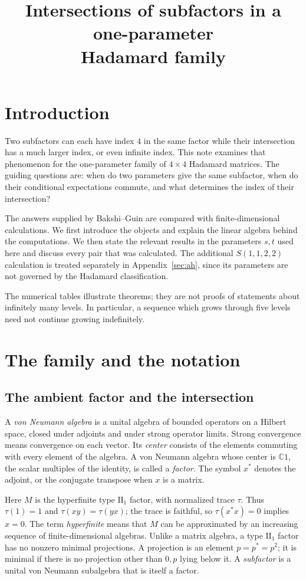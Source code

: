 \documentclass[11pt]{article}
\title{Intersections of subfactors in a one-parameter\\Hadamard family}
\author{}
\date{}
\theoremstyle{definition}
\theoremstyle{remark}
\newcommand{\C}{\mathbb C}
\newcommand{\tr}{\tau}
\begin{document}
\maketitle
\vspace{-2em}

\section{Introduction}
Two subfactors can each have index \(4\) in the same factor while their
intersection has a much larger index, or even infinite index. This note
examines that phenomenon for the one-parameter family of \(4\times4\)
Hadamard matrices. The guiding questions are: when do two parameters give
the same subfactor, when do their conditional expectations commute, and
what determines the index of their intersection?

The answers supplied by Bakshi--Guin are compared with finite-dimensional
calculations. We first introduce the objects and explain the linear algebra
behind the computations. We then state the relevant results in the
parameters \(s,t\) used here and discuss every pair that was calculated.
The additional \(S(1,1,2,2)\) calculation is treated separately in
Appendix~\ref{sec:ah}, since its parameters are not governed by the
Hadamard classification.

The numerical tables illustrate theorems; they are not proofs of
statements about infinitely many levels. In particular, a sequence which
grows through five levels need not continue growing indefinitely.

\section{The family and the notation}\label{sec:setup}
\subsection{The ambient factor and the intersection}
A \emph{von Neumann algebra} is a unital algebra of bounded operators on a
Hilbert space, closed under adjoints and under strong operator limits.
Strong convergence means convergence on each vector. Its \emph{center}
consists of the elements commuting with every element of the algebra.
A von Neumann algebra whose center is \(\C1\), the scalar multiples of
the identity, is called a \emph{factor}. The symbol \(x^*\) denotes
the adjoint, or the conjugate transpose when \(x\) is a matrix.

Here \(M\) is the hyperfinite type \(\mathrm{II}_1\) factor, with normalized
trace \(\tr\). Thus \(\tr(1)=1\) and \(\tr(xy)=\tr(yx)\); the trace is
faithful, so \(\tr(x^*x)=0\) implies \(x=0\). The term \emph{hyperfinite}
means that \(M\) can be approximated by an increasing sequence of
finite-dimensional algebras. Unlike a matrix algebra, a type
\(\mathrm{II}_1\) factor has no nonzero minimal projections.
A projection is an element \(p=p^*=p^2\); it is minimal if there
is no projection other than \(0,p\) lying below it.
A \emph{subfactor} is a unital von Neumann subalgebra that is itself a factor.
\end{document}

